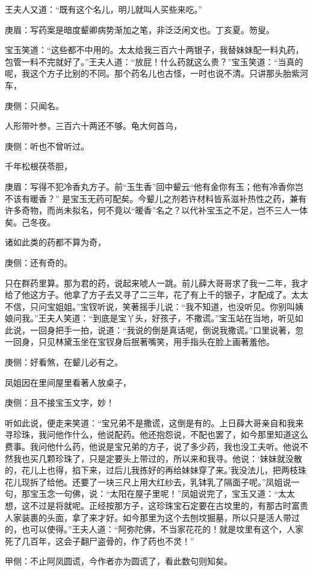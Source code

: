 \begin{parag}
    王夫人又道：“既有这个名儿，明儿就叫人买些来吃。”\begin{note}庚眉：写药案是暗度颦卿病势渐加之笔，非泛泛闲文也。丁亥夏。笏叟。\end{note}宝玉笑道：“这些都不中用的。太太给我三百六十两银子，我替妹妹配一料丸药，包管一料不完就好了。”王夫人道：“放屁！什么药就这么贵？”宝玉笑道：“当真的呢，我这个方子比别的不同。那个药名儿也古怪，一时也说不清。只讲那头胎紫河车，\begin{note}庚侧：只闻名。\end{note}人形带叶参，三百六十两还不够。龟大何首乌，\begin{note}庚侧：听也不曾听过。\end{note}千年松根茯苓胆，\begin{note}庚眉：写得不犯冷香丸方子。前“玉生香”回中颦云“他有金你有玉；他有冷香你岂不该有暖香？” 是宝玉无药可配矣。今颦儿之剂若许材料皆系滋补热性之药，兼有许多奇物，而尚未拟名，何不竟以“暖香”名之？以代补宝玉之不足，岂不三人一体矣。己冬夜。\end{note}诸如此类的药都不算为奇，\begin{note}庚侧：还有奇的。\end{note}只在群药里算。那为君的药，说起来唬人一跳。前儿薛大哥哥求了我一二年，我才给了他这方子。他拿了方子去又寻了二三年，花了有上千的银子，才配成了。太太不信，只问宝姐姐。”宝钗听说，笑著摇手儿说：“我不知道，也没听见。你别叫姨娘问我。”王夫人笑道：“到底是宝丫头，好孩子，不撒谎。”宝玉站在当地，听见如此说，一回身把手一拍，说道：“我说的倒是真话呢，倒说我撒谎。”口里说著，忽一回身，只见林黛玉坐在宝钗身后抿著嘴笑，用手指头在脸上画著羞他。\begin{note}庚侧：好看煞，在颦儿必有之。\end{note}
\end{parag}


\begin{parag}
    凤姐因在里间屋里看著人放桌子，\begin{note}庚侧：且不接宝玉文字，妙！\end{note}听如此说，便走来笑道：“宝兄弟不是撒谎，这倒是有的。上日薛大哥亲自和我来寻珍珠，我问他作什么，他说配药。他还抱怨说，不配也罢了，如今那里知道这么费事。我问他什么药，他说是宝兄弟的方子，说了多少药，我也没工夫听。他说不然我也买几颗珍珠了，只是定要头上带过的，所以来和我寻。他说：‘妹妹就没散的，花儿上也得，掐下来，过后儿我拣好的再给妹妹穿了来。’我没法儿，把两枝珠花儿现拆了给他。还要了一块三尺上用大红纱去，乳钵乳了隔面子呢。”凤姐说一句，那宝玉念一句佛，说：“太阳在屋子里呢！”凤姐说完了，宝玉又道：“太太想，这不过是将就呢。正经按那方子，这珍珠宝石定要在古坟里的，有那古时富贵人家装裹的头面，拿了来才好。如今那里为这个去刨坟掘墓，所以只是活人带过的，也可以使得。”王夫人道：“阿弥陀佛，不当家花花的！就是坟里有这个，人家死了几百年，这会子翻尸盗骨的，作了药也不灵！”\begin{note}甲侧：不止阿凤圆谎，今作者亦为圆谎了，看此数句则知矣。\end{note}
\end{parag}


